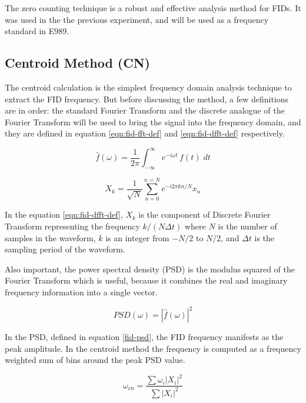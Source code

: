 The zero counting technique is a robust and effective analysis method for FIDs.  It was used in the the previous \mugmtwo experiment, and will be used as a frequency standard in E989.

\subsection{Centroid Method (CN)}
The centroid calculation is the simplest frequency domain analysis technique to extract the FID frequency.  But before discussing the method, a few definitions are in order: the standard Fourier Transform and the discrete analogue of the Fourier Transform will be used to bring the signal into the frequency domain, and they are defined in equation \ref{eqn:fid-fft-def} and \ref{eqn:fid-dfft-def} respectively.

\begin{equation}
\label{eqn:fid-fft-def}
\hat{f}(\omega) = \frac{1}{2\pi} \int_{-\infty}^{\infty} e^{-i \omega t}\, f(t) \;dt
\end{equation}

\begin{equation}
\label{eqn:fid-dfft-def}
X_k = \frac{1}{\sqrt{N}} \sum_{n=0}^{n=N} e^{-i 2\pi k n / N} x_n
\end{equation}

\noindent
In the equation \ref{eqn:fid-dfft-def}, $X_k$ is the component of Discrete Fourier Transform representing the frequency $k / (N \Delta t)$ where $N$ is the number of samples in the waveform, $k$ is an integer from $-N/2$ to $N/2$, and $\Delta t$ is the sampling period of the waveform.  

Also important, the power spectral density (PSD) is the modulus squared of the Fourier Transform which is useful, because it combines the real and imaginary frequency information into a single vector.

\begin{equation}
\label{eqn:fid-psd}
PSD(\omega) = |\hat{f}(\omega)|^2
\end{equation}

\noindent
In the PSD, defined in equation \ref{fid-psd}, the FID frequency manifests as the peak amplitude.  In the centroid method the frequency is computed as a frequency weighted sum of bins around the peak PSD value.

\begin{equation}
\label{eqn:freq-cn}
\omega_{cn} = 
\frac{\sum \omega_i |X_i|^2}{\sum |X_i|^2}
\end{equation}

